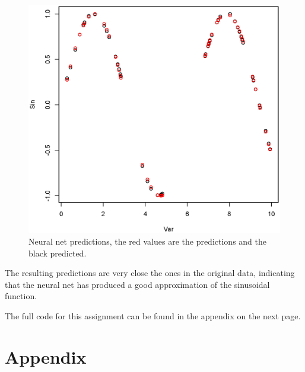 \documentclass[a4paper, 12p]{article}
\begin{document}
    \begin{figure}[H]
        \centering
        \caption{Neural net predictions, the red values are the predictions and the black predicted.}
        \label{fig:predictions}
        \includegraphics[width=\textwidth]{share/predictions.eps}
    \end{figure}
    The resulting predictions are very close the ones in the original data, indicating that the neural net has produced a good approximation of the sinusoidal function.

    The full code for this assignment can be found in the appendix on the next page.

    \nocite{*} %
    
    
    \onecolumn \appendix
    \section*{Appendix}

    
\end{document}
